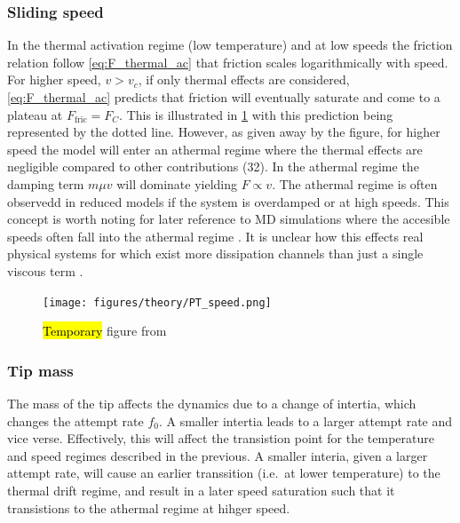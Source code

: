 


\subsubsection{Sliding speed}
In the thermal activation regime (low temperature) and at low speeds the friction relation follow \cref{eq:F_thermal_ac} that friction scales logarithmically with speed. For higher speed, $v > v_c$, if only thermal effects are considered, \cref{eq:F_thermal_ac} predicts that friction will eventually saturate and come to a plateau at $F_{\text{fric}} = F_C$. This is illustrated in \cref{fig:PT_speed} with this prediction being represented by the dotted line. However, as given away by the figure, for higher speed the model will enter an athermal regime where the thermal effects are negligible compared to other contributions \cite{Yalin_2011}(32). In the athermal regime the damping term $m\mu v$ will dominate yielding $F
\propto v$. The athermal regime is often observedd in reduced models if the system is overdamped or at high speeds. This concept is worth noting for later reference to \acrshort{MD} simulations where the accesible speeds often fall into the athermal regime \cite{Li_2011}. It is unclear how this effects real physical systems for which exist more dissipation channels than just a single viscous term \cite{Dong_2013}.


\begin{figure}[H]
  \centering
  \texttt{[image: figures/theory/PT\_speed.png]}
  \caption{\hl{Temporary} figure from \cite{Yalin_2011}}
  \label{fig:PT_speed}
\end{figure}


\subsubsection{Tip mass}
The mass of the tip affects the dynamics due to a change of intertia, which changes the attempt rate $f_0$. A smaller intertia leads to a larger attempt rate and vice verse. Effectively, this will affect the transistion point for the temperature and speed regimes described in the previous. A smaller interia, given a larger attempt rate, will cause an earlier transsition (i.e.\ at lower temperature) to the thermal drift regime, and result in a later speed saturation such that it transistions to the athermal regime at hihger speed. 



